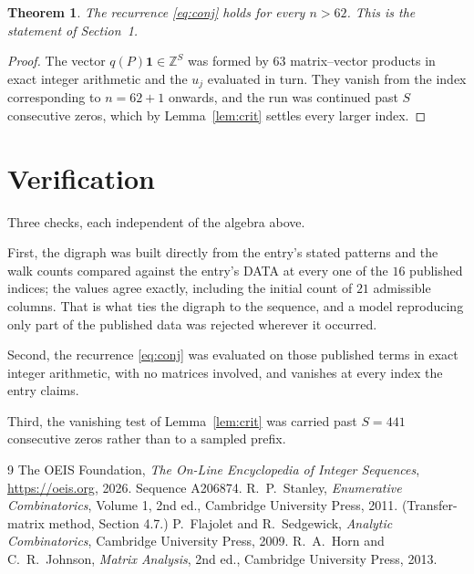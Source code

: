 \documentclass[11pt,a4paper]{article}
\theoremstyle{plain}
\newtheorem{theorem}{Theorem}
\theoremstyle{definition}
\begin{document}
\begin{theorem}
The recurrence \eqref{eq:conj} holds for every $n>62$. This is the statement of
Section~1.
\end{theorem}

\begin{proof}
The vector $q(P)\mathbf{1}\in\mathbb{Z}^{S}$ was formed by $63$ matrix--vector
products in exact integer arithmetic and the $u_j$ evaluated in turn. They vanish from the
index corresponding to $n=62+1$ onwards, and the run was continued past $S$ consecutive
zeros, which by Lemma~\ref{lem:crit} settles every larger index.
\end{proof}

\section{Verification}

Three checks, each independent of the algebra above.

First, the digraph was built directly from the entry's stated patterns and the walk counts
compared against the entry's DATA at every one of the $16$ published indices; the
values agree exactly, including the initial count of $21$ admissible columns. That is
what ties the digraph to the sequence, and a model reproducing only part of the published
data was rejected wherever it occurred.

Second, the recurrence \eqref{eq:conj} was evaluated on those published terms in exact
integer arithmetic, with no matrices involved, and vanishes at every index the entry claims.

Third, the vanishing test of Lemma~\ref{lem:crit} was carried past $S=441$ consecutive
zeros rather than to a sampled prefix.

\begin{thebibliography}{9}
 The OEIS Foundation, \emph{The On-Line Encyclopedia of Integer
Sequences}, \url{https://oeis.org}, 2026. Sequence A206874.
 R.~P.~Stanley, \emph{Enumerative Combinatorics}, Volume 1, 2nd ed.,
Cambridge University Press, 2011. (Transfer-matrix method, Section 4.7.)
 P.~Flajolet and R.~Sedgewick, \emph{Analytic Combinatorics}, Cambridge
University Press, 2009.
 R.~A.~Horn and C.~R.~Johnson, \emph{Matrix Analysis}, 2nd ed., Cambridge
University Press, 2013.
\end{thebibliography}
\end{document}
